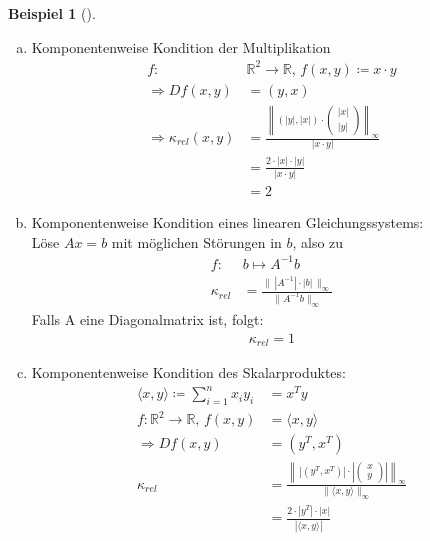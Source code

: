 \documentclass[ngerman,fontsize=11pt, paper=a4, parskip=half, titlepage=true, toc=bib]{scrbook}
\theoremstyle{definition}
\newtheorem{Bsp}[Def]{Beispiel}
\theoremstyle{plain}
\newcommand{\R}{\mathds{R}}
\newcommand{\subsectione}[1]{\addtocounter{Def}{1}\subsection{#1}}
\newenvironment{Bspe}[1][]{ %
  \begin{Bsp}[#1]
  }
  {
  \end{Bsp}
  \addtocounter{subsection}{1}
}
\begin{document}
\begin{Bspe}~
  \begin{enumerate}[a)]
  \item Komponentenweise Kondition der Multiplikation
    \begin{align*}
      f:&\R^2 \rightarrow \R, \, f(x,y) \coloneqq x\cdot y \\
      \Rightarrow Df(x,y) &= (y, x)  \\
      \Rightarrow \kappa_{rel}(x,y) &= \frac{\left\| (|y|, |x|)\cdot \begin{pmatrix}
            |x| \\
            |y|
          \end{pmatrix}\right\|_\infty}
      {|x\cdot y|} \\
        &= \frac{2\cdot|x|\cdot |y|}{|x\cdot y|} \\
        &= 2
    \end{align*}
  \item Komponentenweise Kondition eines linearen Gleichungssystems:\\
    Löse $Ax=b$ mit möglichen Störungen in $b$, also zu
    \begin{align*}
      f: & b\mapsto A^{-1}b \\
      \kappa_{rel} & = \frac{\| \, |A^{-1}| \cdot |b|\, \|_\infty}{\|A^{-1}b\|_\infty}
    \end{align*}
    Falls A eine Diagonalmatrix ist, folgt:
    \begin{gather*}
      \kappa_{rel}=1
    \end{gather*}
  \item Komponentenweise Kondition des Skalarproduktes:
    \begin{align*}
      \langle x,y \rangle \coloneqq \sum_{i=1}^{n}x_i y_i& = x^Ty \\
      f: \R^2 \rightarrow \R, \, f(x,y) &= \langle x,y \rangle \\
      \Rightarrow Df(x,y) &= (y^T, x^T) \\
      \kappa_{rel}  &= \frac{\left\| \,\left|(y^T, x^T)\right|\cdot\left|\begin{pmatrix}
              x \\
              y
            \end{pmatrix}\right|\right\|_\infty }
      {\|\langle x,y\rangle\|_\infty}\\
                                                         &= \frac{2\cdot |y^T|\cdot |x|}{|\langle x,y\rangle|} \\

\end{align*}
\end{enumerate}
\end{Bspe}
\end{document}
